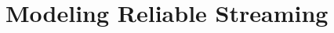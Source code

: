 \documentclass{beamer}
\begin{document}








\section{Modeling Reliable Streaming}
\end{document}
